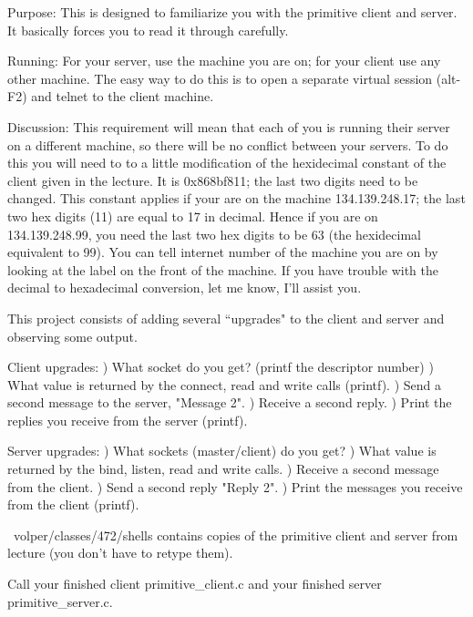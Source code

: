 

\parindent 0pt

Purpose: This is designed to familiarize you with the primitive client
and server. It basically forces you to read it through carefully.

Running: For your server, use the machine you are on;
for your client use any other machine.
The easy way to do this is to open a separate virtual session
(alt-F2) and telnet to the client machine.

Discussion: This requirement will mean that each of you is running
their server on a different machine, so there will be no conflict
between your servers.
To do this you will need to to a little modification of the
hexidecimal constant of the client given in the lecture.
It is 0x868bf811; the last two digits need to be changed.
This constant applies if your are on the machine 134.139.248.17;
the last two hex digits (11) are equal to 17 in decimal.
Hence if you are on 134.139.248.99, you need the last two hex digits
to be 63 (the hexidecimal equivalent to 99).
You can tell internet number of the machine you are on by looking at the label
on the front of the machine.
If you have trouble with the decimal to hexadecimal conversion, let me
know, I'll assist you.

This project consists of adding several ``upgrades" to the client and
server and observing some output.

Client upgrades:
\hfill{}) What socket do you get? (printf the descriptor number)
\hfill{}) What value is returned by the connect, read and write calls (printf).
\hfill{}) Send a second message to the server, {\ltt{}"Message 2"}.
\hfill{}) Receive a second reply.
\hfill{}) Print the replies you receive from the server (printf).

Server upgrades:
\hfill{}) What sockets (master/client) do you get?
\hfill{}) What value is returned by the bind, listen, read and write calls.
\hfill{}) Receive a second message from the client.
\hfill{}) Send a second reply {\ltt{}"Reply 2"}.
\hfill{}) Print the messages you receive from the client (printf).

{\ltt{}~volper/classes/472/shells} contains copies
of the primitive client and server from lecture
(you don't have to retype them).

Call your finished client {\ltt{}primitive_client.c} and 
your finished server {\ltt{}primitive_server.c}.
\bye
